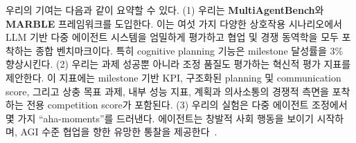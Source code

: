 


우리의 기여는 다음과 같이 요약할 수 있다.
(1) 우리는 \textbf{MultiAgentBench}와 \textbf{MARBLE} 프레임워크를 도입한다. 이는 여섯 가지 다양한 상호작용 시나리오에서 LLM 기반 다중 에이전트 시스템을 엄밀하게 평가하고 협업 및 경쟁 동역학을 모두 포착하는 종합 벤치마크이다. 특히 cognitive planning 기능은 milestone 달성률을 3\% 향상시킨다.
(2) 우리는 과제 성공뿐 아니라 조정 품질도 평가하는 혁신적 평가 지표를 제안한다. 이 지표에는 milestone 기반 KPI, 구조화된 planning 및 communication score, 그리고 상충 목표 과제, 내부 성능 지표, 계획과 의사소통의 경쟁적 측면을 포착하는 전용 competition score가 포함된다.
(3) 우리의 실험은 다중 에이전트 조정에서 몇 가지 ``aha-moments''를 드러낸다. 에이전트는 창발적 사회 행동을 보이기 시작하며, AGI 수준 협업을 향한 유망한 통찰을 제공한다~\citep{feng2024how}.




